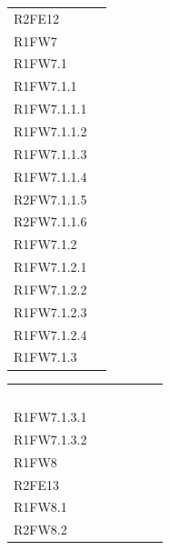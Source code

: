 \begin{table}[H]
\begin{tabular}[t]{ m{}<{\centering}  m{}<{\centering} }
	R2FE12 & \Ns \\			
	 
	R1FW7 & \So \\	
	
	R1FW7.1 & \So \\

	R1FW7.1.1 & \So \\

	R1FW7.1.1.1 & \So \\

	R1FW7.1.1.2 & \So \\
	
	R1FW7.1.1.3 & \So \\

	R1FW7.1.1.4 & \So \\
	
	R2FW7.1.1.5 & \Ns \\		
	
	R2FW7.1.1.6 & \Ns \\

	R1FW7.1.2 & \So \\
	
	R1FW7.1.2.1 & \So \\
	
	R1FW7.1.2.2 & \So \\
	
	R1FW7.1.2.3 & \So \\
	
	R1FW7.1.2.4 & \So \\
	
	R1FW7.1.3 & \So \\		

\end{tabular}
\begin{tabular}[t]{ m{}<{\centering}  m{}<{\centering} }
	\rowcolor{darkblue}
	\textcolor{white}{\textbf{Fonte}} &\textcolor{white}{\textbf{Requisiti}}\\ 	

	R1FW7.1.3.1 & \So \\
	
	R1FW7.1.3.2 & \So \\
	
	R1FW8 & \Ns \\		
	
	R2FE13 & \Ns \\	
	 
	R1FW8.1 & \Ns \\	
	
	R2FW8.2 & \Ns \\	 
	 

\end{tabular}
\end{table}
